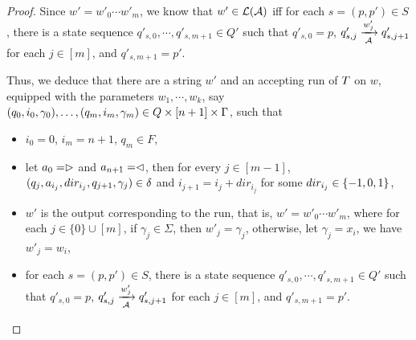 \begin{proof}
Since $ w' = w'_0 \cdots w'_m$, we know that $w' \in \mathcal{L}(\mathcal{A})$ iff for each $s=(p, p') \in S$, there is a state sequence $q'_{s,0}, \cdots, q'_{s,m+1} \in Q'$ such that  $q'_{s,0}= p$, $q'_{s,j} \xrightarrow[\mathcal{A}]{w'_j} q'_{s, j+1}$ for each $j \in [m]$,  and $q'_{s, m+1} = p'$.

Thus, we deduce that 
there are a string $w' $ and an accepting run of $T$ on $w$, equipped with the parameters $w_1,\cdots, w_k$, say $(q_0, i_0, \gamma_0),\ldots, (q_m, i_m, \gamma_m) \in Q \times [n+1] \times \Gamma$, such that 
%
\begin{itemize}
\item $i_0=0$, $i_m = n+1$, $q_m \in F$,
%
\item let $a_0 = \vartriangleright$ and $a_{n+1} = \vartriangleleft$,  then for every $j \in [m-1]$, $(q_j, a_{i_j}, dir_{i_j}, q_{j+1}, \gamma_j) \in
        \delta$ and $i_{j+1} = i_j + dir_{i_j}$ for some $dir_{i_j} \in \{-1, 0, 1\}$, 
 \item $w'$ is the output corresponding to the run, that is, $ w' = w'_0 \cdots w'_m$, where for each $j \in \{0\} \cup [m]$, if $\gamma_j \in \Sigma$, then $w'_j = \gamma_j$, otherwise, let $\gamma_j = x_i$, we have $w'_j = w_i$,
 \item  for each $s=(p, p') \in S$, there is a state sequence $q'_{s,0}, \cdots, q'_{s,m+1} \in Q'$ such that  $q'_{s,0}= p$, $q'_{s,j} \xrightarrow[\mathcal{A}]{w'_j} q'_{s, j+1}$ for each $j \in [m]$,  and $q'_{s, m+1} = p'$.
\end{itemize}


\end{proof}
